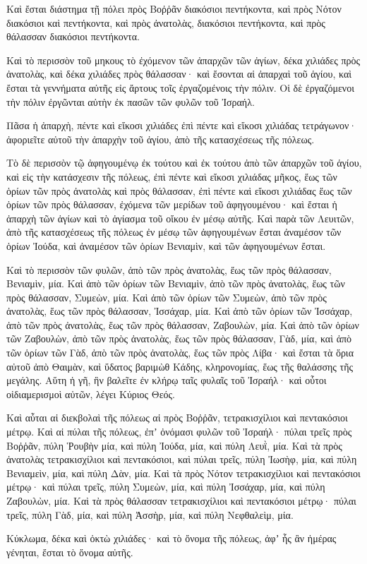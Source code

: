 {Καὶ ἔσται διάστημα τῇ πόλει πρὸς Βοῤῥᾶν διακόσιοι πεντήκοντα, καὶ πρὸς Νότον διακόσιοι καὶ πεντήκοντα, καὶ πρὸς ἀνατολὰς, διακόσιοι πεντήκοντα, καὶ πρὸς θάλασσαν διακόσιοι πεντήκοντα.
\par }{\PP {}Καὶ τὸ περισσὸν τοῦ μηκους τὸ ἐχόμενον τῶν ἀπαρχῶν τῶν ἁγίων, δέκα χιλιάδες πρὸς ἀνατολὰς, καὶ δέκα χιλιάδες πρὸς θάλασσαν· καὶ ἔσονται αἱ ἀπαρχαὶ τοῦ ἁγίου, καὶ ἔσται τὰ γεννήματα αὐτῆς εἰς ἄρτους τοῖς ἐργαζομένοις τὴν πόλιν.
Οἱ δὲ ἐργαζόμενοι τὴν πόλιν ἐργῶνται αὐτὴν ἐκ πασῶν τῶν φυλῶν τοῦ Ἰσραήλ.
\par }{\PP {}Πᾶσα ἡ ἀπαρχὴ, πέντε καὶ εἴκοσι χιλιάδες ἐπὶ πέντε καὶ εἴκοσι χιλιάδας τετράγωνον· ἀφοριεῖτε αὐτοῦ τὴν ἀπαρχὴν τοῦ ἁγίου, ἀπὸ τῆς κατασχέσεως τῆς πόλεως.
\par }{\PP {}Τὸ δὲ περισσὸν τῷ ἀφηγουμένῳ ἐκ τούτου καὶ ἐκ τούτου ἀπὸ τῶν ἀπαρχῶν τοῦ ἁγίου, καὶ εἰς τὴν κατάσχεσιν τῆς πόλεως, ἐπὶ πέντε καὶ εἴκοσι χιλιάδας μῆκος, ἕως τῶν ὁρίων τῶν πρὸς ἀνατολὰς καὶ πρὸς θάλασσαν, ἐπὶ πέντε καὶ εἴκοσι χιλιάδας ἕως τῶν ὁρίων τῶν πρὸς θάλασσαν, ἐχόμενα τῶν μερίδων τοῦ ἀφηγουμένου· καὶ ἔσται ἡ ἀπαρχὴ τῶν ἁγίων καὶ τὸ ἁγίασμα τοῦ οἴκου ἐν μέσῳ αὐτῆς.
Καὶ παρὰ τῶν Λευιτῶν, ἀπὸ τῆς κατασχέσεως τῆς πόλεως ἐν μέσῳ τῶν ἀφηγουμένων ἔσται ἀναμέσον τῶν ὁρίων Ἰούδα, καὶ ἀναμέσον τῶν ὁρίων Βενιαμὶν, καὶ τῶν ἀφηγουμένων ἔσται.
\par }{\PP {}Καὶ τὸ περισσὸν τῶν φυλῶν, ἀπὸ τῶν πρὸς ἀνατολὰς, ἕως τῶν πρὸς θάλασσαν, Βενιαμὶν, μία.
Καὶ ἀπὸ τῶν ὁρίων τῶν Βενιαμὶν, ἀπὸ τῶν πρὸς ἀνατολὰς, ἕως τῶν πρὸς θάλασσαν, Συμεὼν, μία.
Καὶ ἀπὸ τῶν ὁρίων τῶν Συμεὼν, ἀπὸ τῶν πρὸς ἀνατολὰς, ἕως τῶν πρὸς θάλασσαν, Ἰσσάχαρ, μία.
Καὶ ἀπὸ τῶν ὁρίων τῶν Ἰσσάχαρ, ἀπὸ τῶν πρὸς ἀνατολὰς, ἕως τῶν πρὸς θάλασσαν, Ζαβουλὼν, μία.
Καὶ ἀπὸ τῶν ὁρίων τῶν Ζαβουλὼν, ἀπὸ τῶν πρὸς ἀνατολὰς, ἕως τῶν πρὸς θάλασσαν, Γὰδ, μία,
καὶ ἀπὸ τῶν ὁρίων τῶν Γὰδ, ἀπὸ τῶν πρὸς ἀνατολὰς, ἕως τῶν πρὸς Λίβα· καὶ ἔσται τὰ ὅρια αὐτοῦ ἀπὸ Θαιμὰν, καὶ ὕδατος βαριμὼθ Κάδης, κληρονομίας, ἕως τῆς θαλάσσης τῆς μεγάλης.
Αὕτη ἡ γῆ, ἣν βαλεῖτε ἐν κλήρῳ ταῖς φυλαῖς τοῦ Ἰσραήλ· καὶ οὗτοι οἱδιαμερισμοὶ αὐτῶν, λέγει Κύριος Θεός.
\par }{\PP {}Καὶ αὗται αἱ διεκβολαὶ τῆς πόλεως αἱ πρὸς Βοῤῥᾶν, τετρακισχίλιοι καὶ πεντακόσιοι μέτρῳ.
Καὶ αἱ πύλαι τῆς πόλεως, ἐπʼ ὀνόμασι φυλῶν τοῦ Ἰσραήλ· πύλαι τρεῖς πρὸς Βοῤῥᾶν, πύλη Ῥουβὴν μία, καὶ πύλη Ἰούδα, μία, καὶ πύλη Λευῒ, μία.
Καὶ τὰ πρὸς ἀνατολὰς τετρακισχίλιοι καὶ πεντακόσιοι, καὶ πύλαι τρεῖς, πύλη Ἰωσὴφ, μία, καὶ πύλη Βενιαμεὶν, μία, καὶ πύλη Δὰν, μία.
Καὶ τὰ πρὸς Νότον τετρακισχίλιοι καὶ πεντακόσιοι μέτρῳ· καὶ πύλαι τρεῖς, πύλη Συμεὼν, μία, καὶ πύλη Ἰσσάχαρ, μία, καὶ πύλη Ζαβουλὼν, μία.
Καὶ τὰ πρὸς θάλασσαν τετρακισχίλιοι καὶ πεντακόσιοι μέτρῳ· πύλαι τρεῖς, πύλη Γὰδ, μία, καὶ πύλη Ἀσσὴρ, μία, καὶ πύλη Νεφθαλεὶμ, μία.
\par }{\PP {}Κύκλωμα, δέκα καὶ ὀκτὼ χιλιάδες· καὶ τὸ ὄνομα τῆς πόλεως, ἀφʼ ἧς ἂν ἡμέρας γένηται, ἔσται τὸ ὄνομα αὐτῆς.
\par }